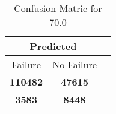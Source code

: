 \begin{table}[] 
\caption{Confusion Matric for 70.0} 
\label{Table: Prediction Accuracy-None70.0DecisionTrees100EKF-ignoreReflection-Reflection} 
\centering 
\begin{tabular} 
 {@{}ccc@{}} 
\toprule 
\multicolumn{2}{c}{\textbf{Predicted}}
 \\ \midrule 
\multicolumn{1}{|c|}{Failure} & 
\multicolumn{1}{c|}{No Failure}
 \\ \midrule 
\multicolumn{1}{|c|}{\color{green}\textbf{110482}} & 
\multicolumn{1}{c|}{\color{green}\textbf{47615}}
 \\ \midrule 
\multicolumn{1}{|c|}{\color{red}\textbf{3583}} & 
\multicolumn{1}{c|}{\color{red}\textbf{8448}}
 \\ \bottomrule 
\end{tabular} 
\end{table} 
